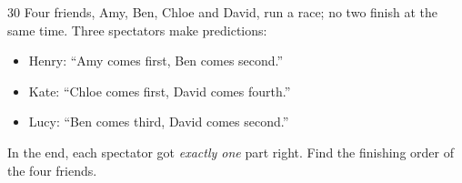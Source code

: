\begin{probbox}{30}{\relax}
Four friends, Amy, Ben, Chloe and David, run a race; no two finish at the same time. Three spectators make predictions:
\begin{itemize}[leftmargin=1.6em,itemsep=0pt,topsep=2pt]
\item Henry: ``Amy comes first, Ben comes second.''
\item Kate: ``Chloe comes first, David comes fourth.''
\item Lucy: ``Ben comes third, David comes second.''
\end{itemize}
In the end, each spectator got \emph{exactly one} part right. Find the finishing order of the four friends.
\end{probbox}
